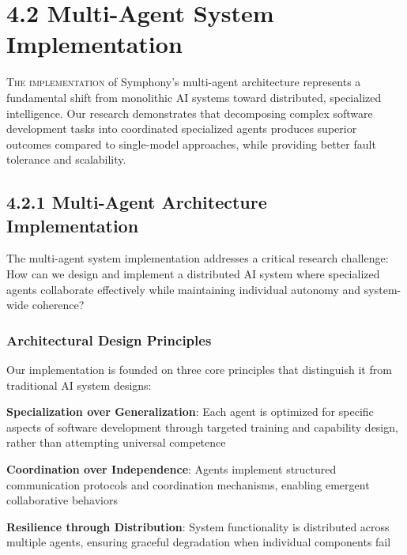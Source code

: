 
\section{4.2 Multi-Agent System Implementation}
\label{sec:multi-agent-impl}

\vspace{0.3cm}
\lettrine{T}{he implementation} of Symphony's multi-agent architecture represents a fundamental shift from monolithic AI systems toward distributed, specialized intelligence. Our research demonstrates that decomposing complex software development tasks into coordinated specialized agents produces superior outcomes compared to single-model approaches, while providing better fault tolerance and scalability.

\subsection*{4.2.1 Multi-Agent Architecture Implementation}

The multi-agent system implementation addresses a critical research challenge: How can we design and implement a distributed AI system where specialized agents collaborate effectively while maintaining individual autonomy and system-wide coherence?

\subsubsection*{Architectural Design Principles}

Our implementation is founded on three core principles that distinguish it from traditional AI system designs:

\begin{expandedlist}
    \item \textbf{Specialization over Generalization}: Each agent is optimized for specific aspects of software development through targeted training and capability design, rather than attempting universal competence
    \item \textbf{Coordination over Independence}: Agents implement structured communication protocols and coordination mechanisms, enabling emergent collaborative behaviors
    \item \textbf{Resilience through Distribution}: System functionality is distributed across multiple agents, ensuring graceful degradation when individual components fail
\end{expandedlist}

